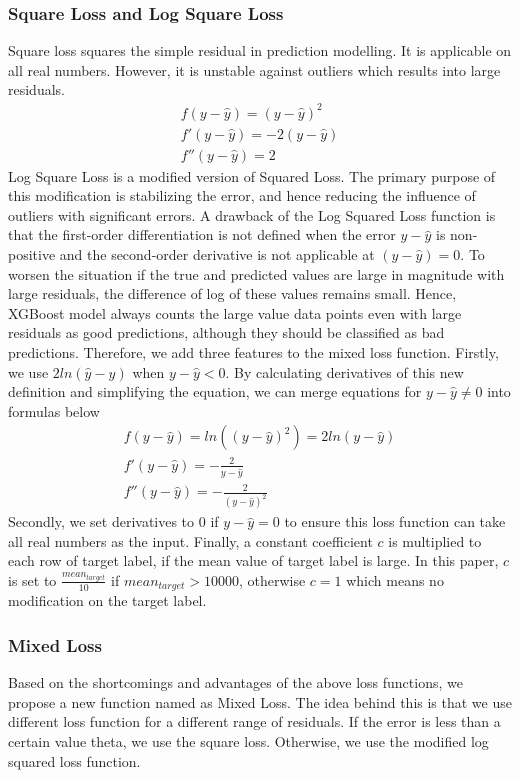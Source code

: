 \documentclass[runningheads]{llncs}
\begin{document}
\subsubsection{Square Loss and Log Square Loss}
Square loss squares the simple residual in prediction modelling. It is applicable on all real numbers. However, it is unstable against outliers which results into large residuals. 
\begin{align}
  f(y-\hat{y}) = (y-\hat{y})^2 \\
  f'(y - \hat{y})= -2(y-\hat{y}) \\
  f''(y - \hat{y})= 2
\end{align}
Log Square Loss is a modified version of Squared Loss. The primary purpose of this modification is stabilizing the error, and hence reducing the influence of outliers with significant errors. A drawback of the Log Squared Loss function is that the first-order differentiation is not defined when the error $y-\hat{y}$ is non-positive and the second-order derivative is not applicable at $(y-\hat{y}) = 0$. To worsen the situation if the true and predicted values are large in magnitude with large residuals, the difference of log of these values remains small. Hence, XGBoost model always counts the large value data points even with large residuals as good predictions, although they should be classified as bad predictions. Therefore, we add three features to the mixed loss function. Firstly, we use $2ln(\hat{y}-y)$ when $y-\hat{y}<0$. By calculating derivatives of this new definition and simplifying the equation, we can merge equations for $y-\hat{y} \neq 0$ into formulas below
\begin{align}
	f(y - \hat{y}) = ln((y-\hat{y})^2) = 2ln(y-\hat{y}) \\
	f'(y - \hat{y})  = -\frac{2}{y - \hat{y}} \\
	f''(y - \hat{y})  = -\frac{2}{(y - \hat{y})^2}
\end{align}
Secondly, we set derivatives to 0 if $y-\hat{y}=0$ to ensure this loss function can take all real numbers as the input. Finally, a constant coefficient $c$ is multiplied to each row of target label, if the mean value of target label is large. In this paper, $c$ is set to $\frac{mean_{target}}{10}$ if $mean_{target} > 10000$, otherwise $c=1$ which means no modification on the target label.

\subsubsection{Mixed Loss} 
Based on the shortcomings and advantages of the above loss functions, we propose a new function named as Mixed Loss. The idea behind this is that we use different loss function for a different range of residuals. If the error is less than a certain value theta, we use the square loss. Otherwise, we use the modified log squared loss function.
\end{document}
